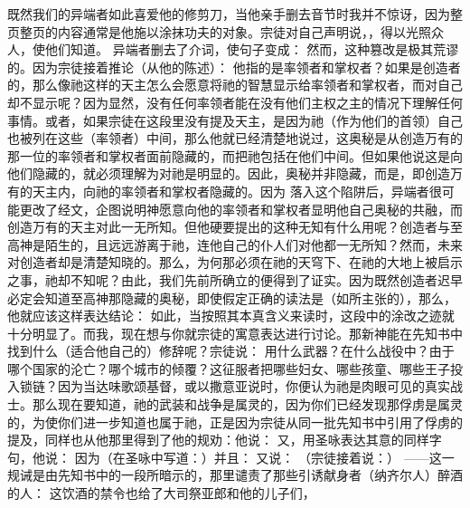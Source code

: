 既然我们的异端者如此喜爱他的修剪刀，当他亲手删去音节时我并不惊讶，因为整页整页的内容通常是他施以涂抹功夫的对象。宗徒对自己声明说，，得以光照众人，使他们知道。 异端者删去了介词，使句子变成： 然而，这种篡改是极其荒谬的。因为宗徒接着推论（从他的陈述）： 他指的是率领者和掌权者？如果是创造者的，那么像祂这样的天主怎么会愿意将祂的智慧显示给率领者和掌权者，而对自己却不显示呢？因为显然，没有任何率领者能在没有他们主权之主的情况下理解任何事情。或者，如果宗徒在这段里没有提及天主，是因为祂（作为他们的首领）自己也被列在这些（率领者）中间，那么他就已经清楚地说过，这奥秘是从创造万有的那一位的率领者和掌权者面前隐藏的，而把祂包括在他们中间。但如果他说这是向他们隐藏的，就必须理解为对祂是明显的。因此，奥秘并非隐藏，而是，即创造万有的天主内，向祂的率领者和掌权者隐藏的。因为 落入这个陷阱后，异端者很可能更改了经文，企图说明神愿意向他的率领者和掌权者显明他自己奥秘的共融，而创造万有的天主对此一无所知。但他硬要提出的这种无知有什么用呢？创造者与至高神是陌生的，且远远游离于祂，连他自己的仆人们对他都一无所知？然而，未来对创造者却是清楚知晓的。那么，为何那必须在祂的天穹下、在祂的大地上被启示之事，祂却不知呢？由此，我们先前所确立的便得到了证实。因为既然创造者迟早必定会知道至高神那隐藏的奥秘，即使假定正确的读法是（如所主张的），那么，他就应该这样表达结论： 如此，当按照其本真含义来读时，这段中的涂改之迹就十分明显了。而我，现在想与你就宗徒的寓意表达进行讨论。那新神能在先知书中找到什么（适合他自己的）修辞呢？宗徒说： 用什么武器？在什么战役中？由于哪个国家的沦亡？哪个城市的倾覆？这征服者把哪些妇女、哪些孩童、哪些王子投入锁链？因为当达味歌颂基督，或以撒意亚说时，你便认为祂是肉眼可见的真实战士。那么现在要知道，祂的武装和战争是属灵的，因为你们已经发现那俘虏是属灵的，为使你们进一步知道也属于祂，正是因为宗徒从同一批先知书中引用了俘虏的提及，同样也从他那里得到了他的规劝：他说： 又，用圣咏表达其意的同样字句，他说：   因为（在圣咏中写道：）并且： 又说： （宗徒接着说：） ——这一规诫是由先知书中的一段所暗示的，那里谴责了那些引诱献身者（纳齐尔人）醉酒的人： 这饮酒的禁令也给了大司祭亚郎和他的儿子们， 